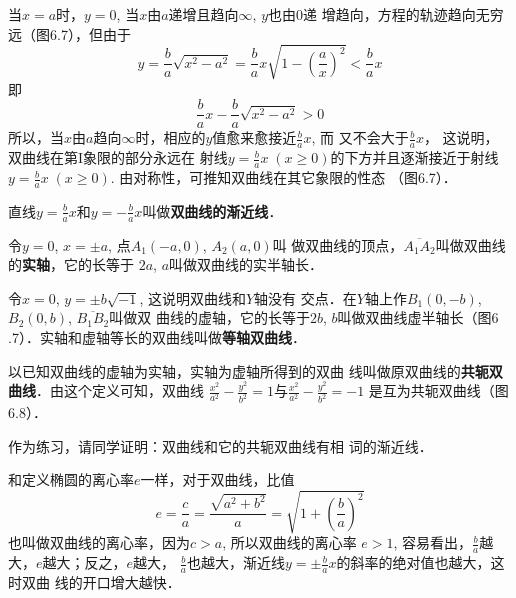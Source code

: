 当$x=a$时，$y=0$, 当$x$由$a$递增且趋向$\infty$, $y$也由0递
增趋向，方程的轨迹趋向无穷远（图6.7），但由于
\[y=\frac{b}{a}\sqrt{x^2-a^2}=\frac{b}{a}x\sqrt{1-\left(\frac{a}{x}\right)^2}<\frac{b}{a}x\]
即
\[\frac{b}{a}x-\frac{b}{a}\sqrt{x^2-a^2}>0\]
所以，当$x$由$a$趋向$\infty$时，相应的$y$值愈来愈接近$\frac{b}{a}x$, 而
又不会大于$\frac{b}{a}x$，
这说明，双曲线在第I象限的部分永远在
射线$y=\frac{b}{a}x\; (x\ge 0)$的下方并且逐渐接近于射线$y=\frac{b}{a}x\; (x\ge 0)$. 由对称性，可推知双曲线在其它象限的性态
（图6.7）．

直线$y=\frac{b}{a}x$和$y=-\frac{b}{a}x$叫做\textbf{双曲线的渐近线}．

令$y=0$, $x=\pm a$, 点$A_1(-a,0)$, $A_2(a,0)$叫
做双曲线的顶点，$\overline{A_1A_2}$叫做双曲线的\textbf{实轴}，它的长等于
$2a$, $a$叫做双曲线的实半轴长．

令$x=0$, $y=\pm b\sqrt{-1}$, 这说明双曲线和$Y$轴没有
交点．在$Y$轴上作$B_1(0,-b)$, $B_2(0,b)$, $\overline{B_1B_2}$叫做双
曲线的虚轴，它的长等于$2b$, $b$叫做双曲线虚半轴长（图6
.7）．实轴和虚轴等长的双曲线叫做\textbf{等轴双曲线}．

以已知双曲线的虚轴为实轴，实轴为虚轴所得到的双曲
线叫做原双曲线的\textbf{共轭双曲线}．由这个定义可知，双曲线
$\frac{x^2}{a^2}-\frac{y^2}{b^2}=1$与$\frac{x^2}{a^2}-\frac{y^2}{b^2}=-1$
是互为共轭双曲线（图6.8）．

作为练习，请同学证明：双曲线和它的共轭双曲线有相
词的渐近线．

\begin{figure}[htp]
    \centering
{}
    \caption{}
\end{figure}

和定义椭圆的离心率$e$一样，对于双曲线，比值
\[e=\frac{c}{a}=\frac{\sqrt{a^2+b^2}}{a}=\sqrt{1+\left(\frac{b}{a}\right)^2}\]
也叫做双曲线的离心率，因为$c>a$, 所以双曲线的离心率
$e>1$, 容易看出，$\frac{b}{a}$越大，$e$越大；反之，$e$越大，
$\frac{b}{a}$也越大，渐近线$y=\pm \frac{b}{a}x$的斜率的绝对值也越大，这时双曲
线的开口增大越快．


